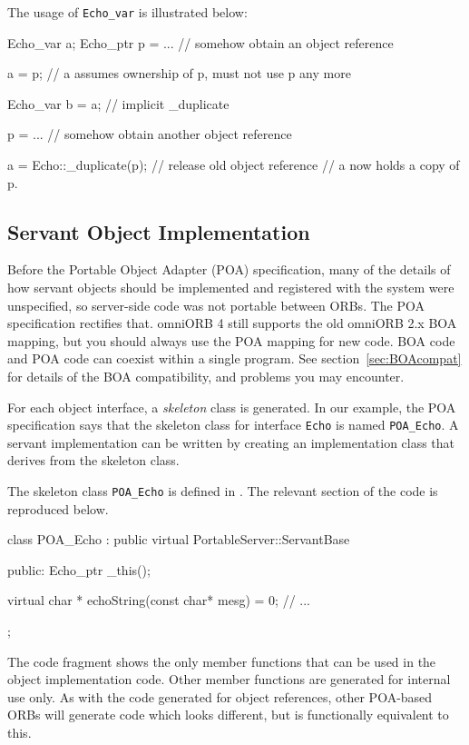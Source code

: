 \documentclass[11pt,twoside,a4paper]{book}
\newcommand{\type}[1]{\texttt{#1}}
\newcommand{\intf}[1]{\texttt{#1}}
\newcommand{\term}[1]{\textit{#1}}
\newcommand{\file}{\begingroup \urlstyle{tt}\Url}
\begin{document}
The usage of \type{Echo\_var} is illustrated below:


\begin{cxxlisting}
Echo_var a;
Echo_ptr p = ... // somehow obtain an object reference

a = p;           // a assumes ownership of p, must not use p any more

Echo_var b = a;  // implicit _duplicate

p = ...          // somehow obtain another object reference

a = Echo::_duplicate(p);     // release old object reference
                             // a now holds a copy of p.
\end{cxxlisting}



\subsection{Servant Object Implementation}
\label{stubobjimpl}

Before the Portable Object Adapter (POA) specification, many of the
details of how servant objects should be implemented and registered
with the system were unspecified, so server-side code was not portable
between ORBs. The POA specification rectifies that. omniORB 4 still
supports the old omniORB 2.x BOA mapping, but you should always use
the POA mapping for new code. BOA code and POA code can coexist within
a single program. See section~\ref{sec:BOAcompat} for details of the
BOA compatibility, and problems you may encounter.

For each object interface, a \term{skeleton} class is generated.  In
our example, the POA specification says that the skeleton class for
interface \intf{Echo} is named \type{POA\_Echo}. A servant
implementation can be written by creating an implementation class that
derives from the skeleton class.

The skeleton class \type{POA\_Echo} is defined in \file{echo.hh}. The
relevant section of the code is reproduced below.

\begin{cxxlisting}
class POA_Echo :
  public virtual PortableServer::ServantBase
{
public:
  Echo_ptr _this();

  virtual char * echoString(const char*  mesg) = 0;
  // ...
};
\end{cxxlisting}

The code fragment shows the only member functions that can be used in
the object implementation code. Other member functions are generated
for internal use only. As with the code generated for object
references, other POA-based ORBs will generate code which looks
different, but is functionally equivalent to this.
\end{document}
